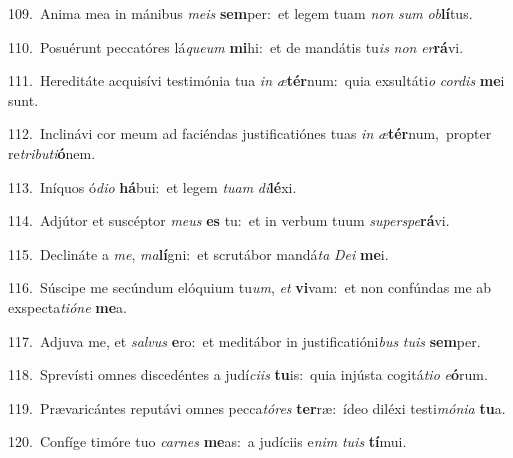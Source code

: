 {\numbfont\textcolor{\numbcolor}{109.}}~Anima mea in mánibus \textit{me}\-\textit{is} \textbf{sem}\-per:~\star et legem tuam \textit{non} \textit{sum} \textit{ob}\-\textbf{lí}tus.\par
{\numbfont\textcolor{\numbcolor}{110.}}~Posuérunt peccatóres lá\-\textit{que}\-\textit{um} \textbf{mi}\-hi:~\star et de mandátis tu\textit{is} \textit{non} \textit{er}\-\textbf{rá}vi.\par
{\numbfont\textcolor{\numbcolor}{111.}}~Hereditáte acquisívi testimónia tua \textit{in} \textit{æ}\-\textbf{tér}num:~\star quia exsultáti\textit{o} \textit{cor}\-\textit{dis} \textbf{me}\-i sunt.\par
{\numbfont\textcolor{\numbcolor}{112.}}~Inclinávi cor meum ad faciéndas justificatiónes tuas \textit{in} \textit{æ}\-\textbf{tér}num,~\star propter re\-\textit{tri}\-\textit{bu}\textit{ti}\textbf{ó}nem.\par
{\numbfont\textcolor{\numbcolor}{113.}}~Iníquos ó\-\textit{di}\-\textit{o} \textbf{há}\-bui:~\star et legem \textit{tu}\-\textit{am} \textit{di}\-\textbf{lé}xi.\par
{\numbfont\textcolor{\numbcolor}{114.}}~Adjútor et suscéptor \textit{me}\-\textit{us} \textbf{es} tu:~\star et in verbum tuum \textit{su}\-\textit{per}\textit{spe}\textbf{rá}vi.\par
{\numbfont\textcolor{\numbcolor}{115.}}~Declináte a \textit{me}\-, \textit{ma}\-\textbf{lí}gni:~\star et scrutábor mandá\textit{ta} \textit{De}\-\textit{i} \textbf{me}\-i.\par
{\numbfont\textcolor{\numbcolor}{116.}}~Súscipe me secúndum elóquium tu\-\textit{um}\-, \textit{et} \textbf{vi}\-vam:~\star et non confúndas me ab exspecta\-\textit{ti}\-\textit{ó}\textit{ne} \textbf{me}\-a.\par
{\numbfont\textcolor{\numbcolor}{117.}}~Adjuva me, et \textit{sal}\-\textit{vus} \textbf{e}\-ro:~\star et meditábor in justificatióni\textit{bus} \textit{tu}\-\textit{is} \textbf{sem}\-per.\par
{\numbfont\textcolor{\numbcolor}{118.}}~Sprevísti omnes discedéntes a judí\-\textit{ci}\-\textit{is} \textbf{tu}\-is:~\star quia injústa cogitá\-\textit{ti}\-\textit{o} \textit{e}\-\textbf{ó}rum.\par
{\numbfont\textcolor{\numbcolor}{119.}}~Prævaricántes reputávi omnes pecca\-\textit{tó}\-\textit{res} \textbf{ter}\-ræ:~\star ídeo diléxi testi\-\textit{mó}\-\textit{ni}\textit{a} \textbf{tu}\-a.\par
{\numbfont\textcolor{\numbcolor}{120.}}~Confíge timóre tuo \textit{car}\-\textit{nes} \textbf{me}\-as:~\star a judíciis e\textit{nim} \textit{tu}\-\textit{is} \textbf{tí}\-mui.\par
